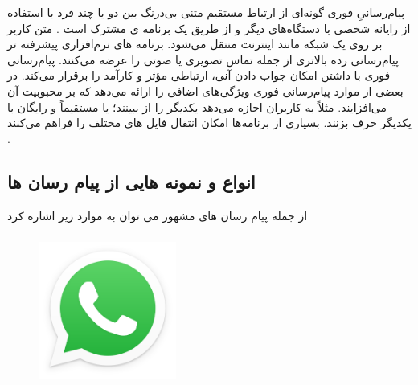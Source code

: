 \documentclass[12pt]{book}
\begin{document}
\begin{figure}
  \vspace{-40pt}
  \vspace{-20pt}
  \vspace{-400pt}
\end{figure}



پیام‌رسانیِ فوری 
گونه‌ای از ارتباط مستقیم متنی بی‌درنگ
بین دو یا چند فرد با استفاده از رایانه شخصی با دستگاه‌های دیگر و از طریق یک برنامه ی مشترک است .
 متن کاربر بر روی یک شبکه مانند اینترنت منتقل می‌شود. برنامه های نرم‌افزاری پیشرفته تر پیام‌رسانی رده‌ بالاتری از جمله تماس تصویری یا صوتی را عرضه می‌کنند. 
پیام‌رسانی فوری با داشتن امکان جواب دادن آنی، ارتباطی مؤثر و کارآمد را برقرار می‌کند. در بعضی از موارد پیام‌رسانی فوری ویژگی‌های اضافی را ارائه می‌دهد که بر محبوبیت آن می‌افزایند. مثلاً به کاربران اجازه می‌دهد یکدیگر را از ببینند؛ یا مستقیماً و رایگان با یکدیگر حرف بزنند. بسیاری از برنامه‌ها امکان انتقال فایل های مختلف را فراهم می‌کنند .



\subsection{انواع و نمونه هایی از پیام رسان ها}

از جمله پیام رسان های مشهور می توان به موارد زیر اشاره کرد 

\subsubsection{}

\begin{figure}
  \vspace{-40pt}
  \begin{center}
    \includegraphics[width=0.4\textwidth]{./766px-WhatsApp.svg.png}
  \end{center}
  \vspace{-20pt}
  \caption{}
  \vspace{-10pt}
\end{figure}
\end{document}
